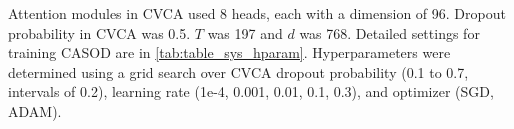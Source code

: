 Attention modules in CVCA used 8 heads, each with a dimension of 96. Dropout probability in CVCA was 0.5. $T$ was 197 and $d$ was 768. Detailed settings for training CASOD are in \ref{tab:table_sys_hparam}.
Hyperparameters were determined using a grid search over CVCA dropout probability (0.1 to 0.7, intervals of 0.2), learning rate (1e-4, 0.001, 0.01, 0.1, 0.3), and optimizer (SGD, ADAM).

